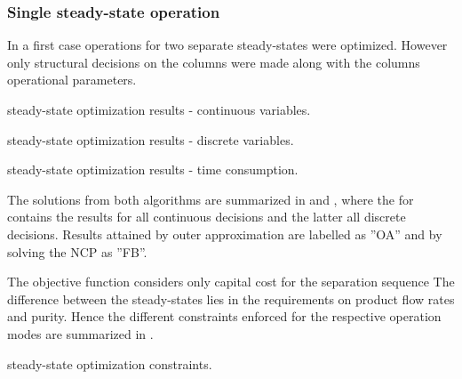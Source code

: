         \subsubsection{Single steady-state operation}
        In a first case operations for two separate steady-states were optimized. However only structural
        decisions on the columns were made along with the columns operational parameters.
        \begin{table}
            \center
            \footnotesize
            
            \caption{steady-state optimization results - continuous variables.}
            \label{tab:ss_result_cont}
        \end{table}
        \begin{table}
            \center
            \footnotesize
            
            \caption{steady-state optimization results - discrete variables.}
            \label{tab:ss_result_disc}
        \end{table}
        \begin{table}
            \center
            \footnotesize
            
            \caption{steady-state optimization results - time consumption.}
            \label{tab:ss_result_time}
        \end{table}
        The solutions from both algorithms are summarized in  and ,
        where the for contains the results for all continuous decisions and the latter all discrete decisions. Results
        attained by outer approximation are labelled as ''OA'' and by solving the NCP as ''FB''.

        The objective function considers only capital cost for the separation sequence
        The difference between the steady-states lies in the requirements on product flow rates and purity. Hence the different
        constraints enforced for the respective operation modes are summarized in .
        \begin{table}
            \center
            \footnotesize
            
            \caption{steady-state optimization constraints.}
            \label{tab:ss_constraints}
        \end{table}

